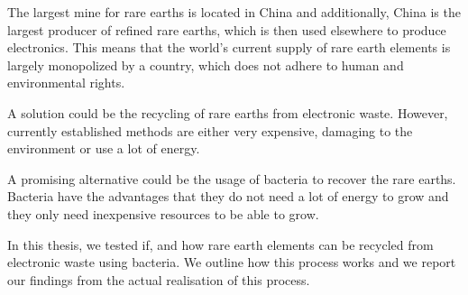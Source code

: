 The largest mine for rare earths is located in China and additionally, China is the largest producer of refined rare earths, which is then used elsewhere to produce electronics.
This means that the world's current supply of rare earth elements is largely monopolized by a country, which does not adhere to human and environmental rights.

A solution could be the recycling of rare earths from electronic waste.
However, currently established methods are either very expensive, damaging to the environment or use a lot of energy.

A promising alternative could be the usage of bacteria to recover the rare earths.
Bacteria have the advantages that they do not need a lot of energy to grow and they only need inexpensive resources to be able to grow.

In this thesis, we tested if, and how rare earth elements can be recycled from electronic waste using bacteria.
We outline how this process works and we report our findings from the actual realisation of this process.